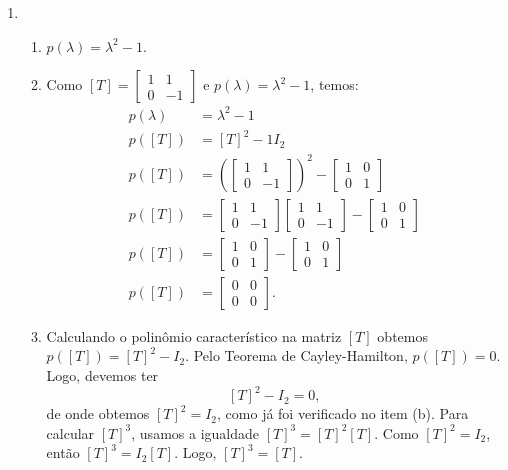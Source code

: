 \begin{enumerate}
\item
\begin{enumerate}[label=(\alph*)]
\item  $p(\lambda)= \lambda^2- 1$.
\item Como  $[T]= \begin{bmatrix}
1 & 1\\
0&- 1\end{bmatrix}$  e $p(\lambda)= \lambda^2- 1$, temos:
\begin{align*}
p(\lambda)&=\lambda^2 - 1\\
p([T])&=[T]^2- 1I_2\\
p([T])&=\left(\begin{bmatrix}
1 & 1\\
0&- 1\end{bmatrix}\right)^2 - \begin{bmatrix}
1 & 0\\
0&1\end{bmatrix}\\
p([T])&=\begin{bmatrix}
1 & 1\\
0&- 1\end{bmatrix} \begin{bmatrix}
1 & 1\\
0&- 1\end{bmatrix}- \begin{bmatrix}
1 & 0\\
0&1\end{bmatrix}\\
p([T])&=\begin{bmatrix}
1 & 0\\
0&1\end{bmatrix} - \begin{bmatrix}
1 & 0\\
0&1\end{bmatrix}\\
p([T])&=\begin{bmatrix}
0 & 0\\
0&0\end{bmatrix}.
\end{align*}
\item  Calculando o  polinômio  característico na matriz  $[T]$ obtemos $p([T])=[T]^2- I_2$. Pelo Teorema de Cayley-Hamilton,  $p([T])=0$. Logo, devemos ter $$[T]^2- I_2=0,$$ de onde obtemos $[T]^2= I_2$, como já foi verificado no item (b). Para calcular $[T]^3$, usamos a igualdade $[T]^3= [T]^2[T]$. Como $[T]^2=I_2$, então  $[T]^3= I_2[T]$. Logo, $[T]^3= [T]$.

\end{enumerate}

\end{enumerate}
